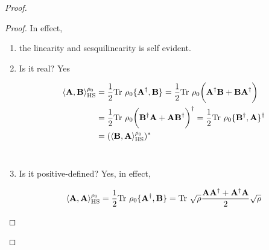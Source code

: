 \documentclass{homework}
\begin{document}
\begin{proof}
\begin{proof}


In effect, 

\begin{enumerate}
    \item the linearity and sesquilinearity is self evident. \\
    \item Is it real? Yes
    
    \begin{equation}
    \begin{split}
        \langle {\bf A}, {\bf B} \rangle_{\textnormal{HS}}^{\rho_0} &= \frac{1}{2}\textnormal{Tr } \rho_0 \{{\bf A}^\dagger, {\bf B}\} = \frac{1}{2} \textnormal{Tr } \rho_0 \bigg({\bf A}^\dagger {\bf B} + {\bf B} {\bf A}^\dagger \bigg)  \\
        &= \frac{1}{2} \textnormal{Tr } \rho_0 \bigg( {\bf B}^\dagger {\bf A}  + {\bf A} {\bf B}^\dagger \bigg)^{\dagger} =  \frac{1}{2}\textnormal{Tr } \rho_0 \{{\bf B}^\dagger, {\bf A}\}^\dagger \\
        &= (\langle {\bf B}, {\bf A} \rangle_{\textnormal{HS}}^{\rho_0})^{*}
        \end{split}
    \end{equation} \\
    
    \item Is it positive-defined? Yes, in effect,
    
    \begin{equation}
        \begin{split}
            \langle {\bf A}, {\bf A} \rangle_{\textnormal{HS}}^{\rho_0}  &=  \frac{1}{2}\textnormal{Tr } \rho_0 \{{\bf A}^\dagger, {\bf B}\} = \textnormal{Tr } \sqrt{\rho} \frac{{\bf A} {\bf A}^{\dagger} + {\bf A}^{\dagger} {\bf A}}{2}\sqrt{\rho} \\
        \end{split}
    \end{equation}
\end{enumerate}
\end{proof}


\end{proof}
\end{document}
